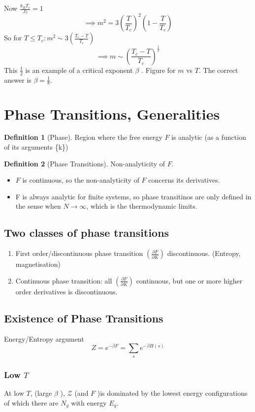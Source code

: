 \documentclass[11pt]{book}
\theoremstyle{definition}
\newtheorem{defn}{Definition}[section]
\begin{document}
Now $ \frac{k_BT_c}{Jz} = 1 $ 
\[ \implies m^2 = 3\left( \frac{T}{T_c} \right)^2 \left( 1-\frac{T}{T_c} \right)  \] 
So for $ T \leq T_c: m^2 \sim 3\left( \frac{T_c-T}{T_c} \right) $  
\[ \implies m \sim \left(\frac{T_c-T}{T_c}\right)^{ \frac{1}{2} } \] 
This $ \frac{1}{2} $ is an example of a critical exponent $ \beta $ .
Figure for $m$ vs $T$.
The correct answer is $ \beta = \frac{1}{8} $.

\section{Phase Transitions, Generalities}
\begin{defn}[Phase]
	Region where the free energy $ F $ is analytic (as a function of its arguments \{k\})
\end{defn}
\begin{defn}[Phase Transitions]
	Non-analyticity of $ F $.
\end{defn}
\begin{itemize}
	\item $ F $ is continuous, so the non-analyticity of $ F $ concerns its derivatives.
	\item F is always analytic for finite systems, so phase transitinos are only defined in the sense when $ N \to \infty $, which is the thermodynamic limits.
\end{itemize}
\subsection{Two classes of phase transitions}
\begin{enumerate}
	\item First order/discontinuous phase transition $ \left( \frac{\partial F}{\partial K} \right) $ discontinuous. (Entropy, magnetisation) 
	\item Continuous phase transition: all $ \left( \frac{\partial F}{\partial K} \right) $ continuous, but one or more higher order derivatives is discontinuous. 
\end{enumerate}

\subsection{Existence of Phase Transitions}
Energy/Entropy argument
\[ Z = e^{-\beta F} = \sum_s e^{-\beta H(s)} \]
\subsubsection{Low $T$}
At low $ T $, (large $ \beta $ ), $ \mathcal{Z} $ (and $ F $ )is dominated by the lowest energy configurations of which there are $ N_g $ with energy $ E_g $. 
\end{document}
